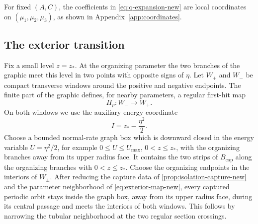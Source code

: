 For fixed $(A,C)$, the coefficients in \eqref{eq:q-expansion-new} are local
coordinates on $(\mu _1,\mu _2,\mu _3)$, as shown in
Appendix~\ref{app:coordinates}.



\subsection{The exterior transition}

Fix a small level $z=z_*$.  At the organizing parameter the two branches of
the graphic meet this level in two points with opposite signs of $\eta$.
Let $W_+$ and $W_-$ be compact transverse windows around the positive and
negative endpoints.  The finite part of the graphic defines, for nearby
parameters, a regular first-hit map
\begin{equation}
\label{eq:exterior-map-new}
 \Pi_p:W_-\longrightarrow W_+.
\end{equation}
On both windows we use the auxiliary energy coordinate
\begin{equation}
\label{eq:physical-energy-new}
 I=z_*-\frac{\eta^2}{2}.
\end{equation}
Choose a bounded normal-rate graph box which is downward closed in
the energy variable \(U=\eta^2/2\), for example
\(0\le U\le U_{\max}\), \(0<z\le z_*\), with the organizing
branches away from its upper radius face. It contains the two strips
of \(B_{\mathrm{cap}}\) along the organizing branches with
\(0<z\le z_*\). Choose the organizing endpoints in the interiors
of \(W_\pm\). After reducing the capture data of
\cref{prop:isolation-capture-new} and the parameter neighborhood of
\eqref{eq:exterior-map-new}, every captured periodic orbit stays inside
the graph box, away from its upper radius face, during its central passage
and meets the interiors of both windows. This follows by narrowing
the tubular neighborhood at the two regular section crossings.


